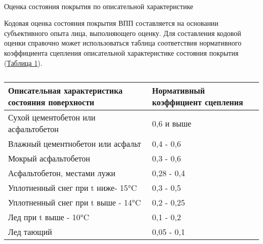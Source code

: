 \paragraph{} Оценка состояния покрытия по описательной характеристике 

Кодовая оценка состояния покрытия ВПП составляется на основании субъективного опыта лица, выполняющего оценку. Для составления кодовой оценки справочно может использоваться таблица соответствия нормативного коэффициента сцепления описательной характеристике состояния покрытия (\hyperref[tbl:04T4]{Таблица \ref*{tbl:04T4}}). 

\begin{table}[H]
    \begin{center}
    \caption{} \label{tbl:04T4}
    \small
    \begin{tabular}{|p{}|p{}|}
    \hline
    Описательная характеристика состояния поверхности	&Нормативный коэффициент сцепления\\
    \hline    
    Сухой цементобетон или асфальтобетон	            &0,6 и выше\\
    Влажный цементнобетон или асфальт	                &0,4 - 0,6\\
    Мокрый асфальтобетон	                            &0,3 - 0,6\\
    Асфальтобетон, местами лужи	                        &0,28 - 0,4\\
    Уплотненный снег при t ниже- 15°C	                &0,3 - 0,5\\
    Уплотненный снег при t выше - 14°C	                &0,2 - 0,25\\
    Лед при t выше - 10°C	                            &0,1 - 0,2\\
    Лед тающий	                                        &0,05 - 0,1\\
    \hline\hline
    \end{tabular}
    \end{center}
\end{table}

